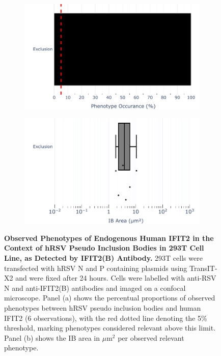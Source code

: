 \begin{figure}
    \begin{subfigure}{0.495\textwidth}
        \caption{}
        \includegraphics[width=1\linewidth]{09. Chapter 4/Figs/01. pIB/03. IFIT2/03. IFIT2B/01. bar_i2b_293t.pdf} 
    \end{subfigure}
    \begin{subfigure}{0.495\textwidth}
        \caption{}
        \includegraphics[width=1\linewidth]{09. Chapter 4/Figs/01. pIB/03. IFIT2/03. IFIT2B/02. box_i2b_293t.pdf}
    \end{subfigure}
    \caption[Observed Phenotypes of Endogenous Human IFIT2 in the Context of hRSV Pseudo Inclusion Bodies in 293T Cell Line, as Detected by IFIT2(B) Antibody.]{\textbf{Observed Phenotypes of Endogenous Human IFIT2 in the Context of hRSV Pseudo Inclusion Bodies in 293T Cell Line, as Detected by IFIT2(B) Antibody.} 293T cells were transfected with hRSV N and P containing plasmids using TransIT-X2 and were fixed after 24 hours. Cells were labelled with anti-RSV N and anti-IFIT2(B) antibodies and imaged on a confocal microscope. Panel (a) shows the percentual proportions of observed phenotypes between hRSV pseudo inclusion bodies and human IFIT2 (6 observations), with the red dotted line denoting the 5\% threshold, marking phenotypes considered relevant above this limit. Panel (b) shows the IB area in \(\mu \mbox{m}^2\) per observed relevant phenotype.}
    \label{fig:Observed Phenotypes of Endogenous Human IFIT2 in the Context of hRSV Pseudo Inclusion Bodies in 293T Cell Line, as Detected by IFIT2(B) Antibody}
\end{figure}

